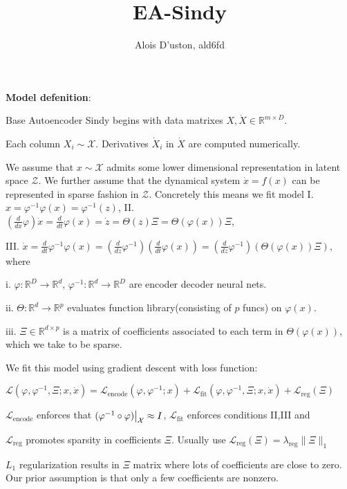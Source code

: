 \documentclass[11pt]{article}
\title{ EA-Sindy}
\author{Alois D'uston,  ald6fd}
\newcommand{\R}{\mathbb{R}}
\newcommand{\dd}[2]{\frac{d{#1}}{d{#2}}}
\newcommand{\tb}{\textbf}
\newcommand{\norm}[2]{\| #1 \|_{#2}}
\newcommand{\restrict}[2]{#1\big{|}_{#2}}
\newcommand{\func}[3]{#1: #2\rightarrow#3}
\begin{document}
\maketitle


\tb{Model defenition}:

Base Autoencoder Sindy begins with data matrixes $X,  \dot{X} \in \R^{m \times D}$. 

Each column $X_i \sim \mathcal{X}$.  Derivatives $\dot{X}_i$ in  $\dot{X}$ are computed numerically.  
 
We assume that $x \sim \mathcal{X}$ admits some lower dimensional representation in latent space  $\mathcal{Z}$.  We further assume that the dynamical system $\dot{x} = f(x)$ can be represented in sparse fashion in $\mathcal{Z}$.  Concretely this means we fit model
 I.  $x =  \varphi^{-1} \varphi(x) = \varphi^{-1}(z)$, 
  II.  $(\dd{}{x}\varphi)  \dot{x} = \dd{}{t}\varphi(x) =   \dot{z} = \Theta(z)\Xi = \Theta(\varphi(x))\Xi$,  

III. $\dot{x}= \dd{}{t} \varphi^{-1} \varphi(x)= (\dd{}{z} \varphi^{-1})(\dd{}{t}\varphi(x)) = (\dd{}{z} \varphi^{-1})(\Theta(\varphi(x))\Xi)$, where 


i.  $\func{\varphi}{\R^D}{\R^d}$, $\func{\varphi^{-1}}{\R^d}{\R^D}$ are encoder decoder neural nets.

ii.  $\func{\Theta}{\R^d}{\R^p}$ evaluates function library(consisting of $p$ funcs) on $\varphi(x)$.

iii.  $\Xi \in \R^{d \times p}$ is a matrix of   coefficients associated to each term in ${\Theta}(\varphi(x))$,  which we take to be sparse.

We fit this model using gradient descent with loss function:

$\mathcal{L}(\varphi, \varphi^{-1},  \Xi ; x ,\dot{x}) = \mathcal{L}_\text{encode}(\varphi, \varphi^{-1}; x) + \mathcal{L}_\text{fit}(\varphi, \varphi^{-1},\Xi; x,\dot{x}) + \mathcal{L}_\text{reg}(\Xi)$

 $\mathcal{L}_\text{encode}$ enforces that $\restrict{(\varphi^{-1} \circ \varphi)}{\mathcal{X}} \approx  I$,  $\mathcal{L}_\text{fit}$ enforces conditions II,III and

 $\mathcal{L}_\text{reg}$ promotes sparsity in  coefficients $\Xi$.
 Usually   use $\mathcal{L}_\text{reg}(\Xi) = \lambda_\text{reg}\norm{\Xi}{1}$
 
 $L_1$ regularization results in $\Xi$ matrix where lots of coefficients are close to zero.  Our prior assumption is that only a few coefficients are nonzero. 
 
\end{document}
